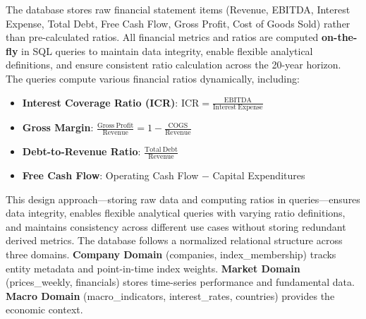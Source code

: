 \documentclass[10pt,a4paper]{article}
\begin{document}
The database stores raw financial statement items (Revenue, EBITDA, Interest Expense, Total Debt, Free Cash Flow, Gross Profit, Cost of Goods Sold) rather than pre-calculated ratios. All financial metrics and ratios are computed \textbf{on-the-fly} in SQL queries to maintain data integrity, enable flexible analytical definitions, and ensure consistent ratio calculation across the 20-year horizon. The queries compute various financial ratios dynamically, including:

\begin{itemize}
    \item \textbf{Interest Coverage Ratio (ICR)}: $\mathrm{ICR} = \frac{\mathrm{EBITDA}}{\mathrm{Interest~Expense}}$
    \item \textbf{Gross Margin}: $\frac{\mathrm{Gross~Profit}}{\mathrm{Revenue}} = 1 - \frac{\mathrm{COGS}}{\mathrm{Revenue}}$
    \item \textbf{Debt-to-Revenue Ratio}: $\frac{\mathrm{Total~Debt}}{\mathrm{Revenue}}$
    \item \textbf{Free Cash Flow}: Operating Cash Flow $-$ Capital Expenditures
\end{itemize}

This design approach---storing raw data and computing ratios in queries---ensures data integrity, enables flexible analytical queries with varying ratio definitions, and maintains consistency across different use cases without storing redundant derived metrics.
The database follows a normalized relational structure across three domains. \textbf{Company Domain} (companies, index\_membership) tracks entity metadata and point-in-time index weights. \textbf{Market Domain} (prices\_weekly, financials) stores time-series performance and fundamental data. \textbf{Macro Domain} (macro\_indicators, interest\_rates, countries) provides the economic context.

\begin{figure}[H]
\centering
{}
\end{figure}
\end{document}
